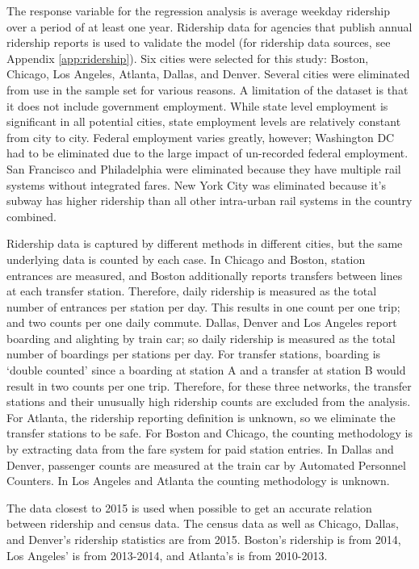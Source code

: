 \documentclass[11pt]{article}
\begin{document}
The response variable for the regression analysis is average weekday ridership over a period of at least one year. Ridership data for agencies that publish annual ridership reports is used to validate the model (for ridership data sources, see Appendix \ref{app:ridership}). Six cities were selected for this study: Boston, Chicago, Los Angeles, Atlanta, Dallas, and Denver. Several cities were eliminated from use in the sample set for various reasons. A limitation of the dataset is that it does not include government employment. While state level employment is significant in all potential cities, state employment levels are relatively constant from city to city. Federal employment varies greatly, however; Washington DC had to be eliminated due to the large impact of un-recorded federal employment. San Francisco and Philadelphia were eliminated because they have multiple rail systems without integrated fares. New York City was eliminated because it's subway has higher ridership than all other intra-urban rail systems in the country combined.

Ridership data is captured by different methods in different cities, but the same underlying data is counted by each case. In Chicago and Boston, station entrances are measured, and Boston additionally reports transfers between lines at each transfer station. Therefore, daily ridership is measured as the total number of entrances per station per day. This results in one count per one trip; and two counts per one daily commute. Dallas, Denver and Los Angeles report boarding and alighting by train car; so daily ridership is measured as the total number of boardings per stations per day. For transfer stations, boarding is `double counted' since a boarding at station A and a transfer at station B would result in two counts per one trip. Therefore, for these three networks, the transfer stations and their unusually high ridership counts are excluded from the analysis. For Atlanta, the ridership reporting definition is unknown, so we eliminate the transfer stations to be safe. For Boston and Chicago, the counting methodology is by extracting data from the fare system for paid station entries. In Dallas and Denver, passenger counts are measured at the train car by Automated Personnel Counters. In Los Angeles and Atlanta the counting methodology is unknown. 

The data closest to 2015 is used when possible to get an accurate relation between ridership and census data. The census data as well as Chicago, Dallas, and Denver's ridership statistics are from 2015. Boston's ridership is from 2014, Los Angeles' is from 2013-2014, and Atlanta's is from 2010-2013. 
\end{document}
